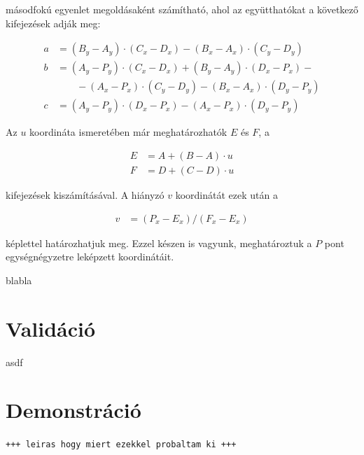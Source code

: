 másodfokú egyenlet megoldásaként számítható, ahol az együtthatókat a következő kifejezések adják meg:

\begin{align}\label{eq:calib_2}
a &= (B_y - A_y) \cdot (C_x - D_x) - (B_x - A_x) \cdot (C_y - D_y) \nonumber \\
b &= (A_y - P_y) \cdot (C_x - D_x) + (B_y - A_y) \cdot (D_x - P_x) - \nonumber \\ 
  & \qquad - (A_x - P_x) \cdot (C_y - D_y) - (B_x - A_x) \cdot (D_y - P_y) \nonumber \\
c &= (A_y - P_y) \cdot (D_x - P_x) - (A_x - P_x) \cdot (D_y - P_y)
\end{align}

Az $u$ koordináta ismeretében már meghatározhatók $E$ és $F$, a

\begin{align}\label{eq:calib_3}
E &= A + (B-A) \cdot u \nonumber \\
F &= D + (C-D) \cdot u
\end{align}

kifejezések kiszámításával. A hiányzó $v$ koordinátát ezek után a 

\begin{align}\label{eq:calib_4}
v &= (P_x - E_x) / (F_x - E_x)
\end{align}

képlettel határozhatjuk meg. Ezzel készen is vagyunk, meghatároztuk a $P$ pont egységnégyzetre leképzett koordinátáit.

\bigskip

blabla

\section{Validáció}\label{sect:validacio}

asdf

\section{Demonstráció}\label{sect:kiserletek}

\texttt{+++ leiras hogy miert ezekkel probaltam ki +++}

